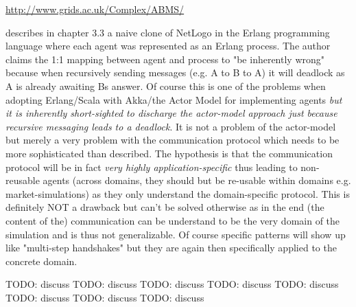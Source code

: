 \url{http://www.grids.ac.uk/Complex/ABMS/}

\cite{Bezirgiannis2013} describes in chapter 3.3 a naive clone of NetLogo in the Erlang programming language where each agent was represented as an Erlang process. The author claims the 1:1 mapping between agent and process to "be inherently wrong" because when recursively sending messages (e.g. A to B to A) it will deadlock as A is already awaiting Bs answer. Of course this is one of the problems when adopting Erlang/Scala with Akka/the Actor Model for implementing agents \textit{but it is inherently short-sighted to discharge the actor-model approach just because recursive messaging leads to a deadlock}. It is not a problem of the actor-model but merely a very problem with the communication protocol which needs to be more sophisticated than \cite{Bezirgiannis2013} described. The hypothesis is that the communication protocol will be in fact \textit{very highly application-specific} thus leading to non-reusable agents (across domains, they should but be re-usable within domains e.g. market-simulations) as they only understand the domain-specific protocol. This is definitely NOT a drawback but can't be solved otherwise as in the end (the content of the) communication can be understand to be the very domain of the simulation and is thus not generalizable. Of course specific patterns will show up like "multi-step handshakes" but they are again then specifically applied to the concrete domain.


TODO: discuss \cite{Hewitt_1973}
TODO: discuss \cite{Greif_1975}
TODO: discuss \cite{Clinger_1981}
TODO: discuss \cite{Agha_1986}
TODO: discuss \cite{Agha_1997}
TODO: discuss \cite{Agha_2004}
TODO: discuss \cite{Hewitt_2007}
TODO: discuss \cite{Hewitt_2010}
